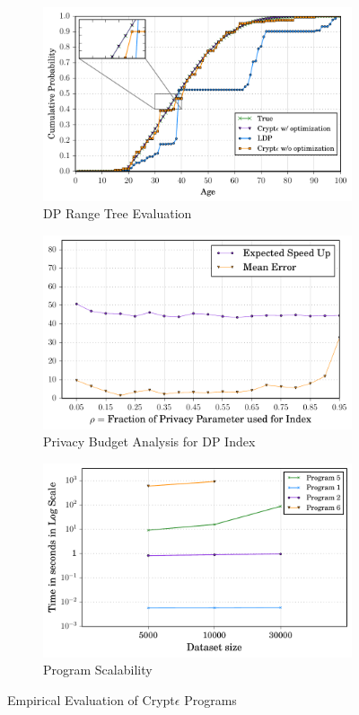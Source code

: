 \begin{figure}[ht]
    \begin{subfigure}[b]{0.25\linewidth}
     \includegraphics[width=1\linewidth]{cdf_final.pdf}
        \caption{DP Range Tree Evaluation}
        \end{subfigure}
        \begin{subfigure}[b]{0.25\linewidth}
     \includegraphics[width=1\linewidth]{index_final.pdf}
        \caption{Privacy Budget Analysis for DP Index}
        \label{Index}
    \end{subfigure}
    \begin{subfigure}[b]{0.25\linewidth}
     \includegraphics[width=1\linewidth]{scalet.pdf}
        \caption{\system Program Scalability}
        \label{Scale}
    \end{subfigure}
   \caption{Empirical Evaluation of Crypt$\epsilon$ Programs}
\end{figure}
